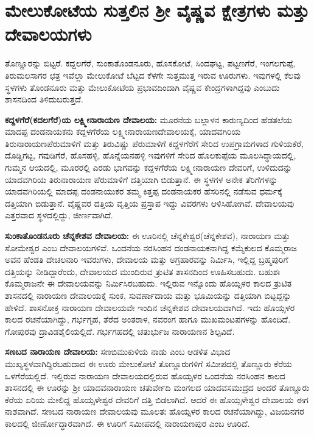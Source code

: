 \section{ಮೇಲುಕೋಟೆಯ ಸುತ್ತಲಿನ ಶ‍್ರೀ ವೈಷ್ಣವ ಕ್ಷೇತ್ರಗಳು ಮತ್ತು ದೇವಾಲಯಗಳು}

ತೊಣ್ಣೂರನ್ನು ಬಿಟ್ಟರೆ. ಕದ್ದಲಗೆರೆ, ಸುಂಕಾತೊಂಡನೂರು, ಹೊಸಕೋಟೆ, ಸಿಂದಘಟ್ಟ, ಪಟ್ಟಣಗೆರೆ, ಇಂಗಲಗುಪ್ಪೆ, ತಿರುಮಲಸಾಗರ ಛತ್ರ ಇವೆಲ್ಲಾ ಮೇಲುಕೋಟೆ ಬೆಟ್ಟದ ಕೆಳಗೇ ಸುತ್ತಮುತ್ತ ಇರುವ ಊರುಗಳು. ಇವುಗಳಲ್ಲಿ ಕೆಲವು ಸ್ಥಳಗಳು ತೊಂಡನೂರು ಮತ್ತು ಮೇಲುಕೋಟೆಯ ಪ್ರಭಾವದಿಂದಾಗಿ ವೈಷ್ಣವ ಕೇಂದ್ರಗಳಾಗಿದ್ದವು ಎಂಬುದು ಶಾಸನದಿಂದ ತಿಳಿದುಬರುತ್ತದೆ.

\textbf{ಕದ್ದಳಗೆರೆ(ಕದಲಗೆರೆ)ಯ ಲಕ್ಷ್ಮೀನಾರಾಯಣ ದೇವಾಲಯ:} ಮೂರನೆಯ ಬಲ್ಲಾಳನ ಕಾರುಣ್ಯದಿಂದ ಹೆಡತಲೆಯ ಮಾದಪ್ಪ ದಂಡನಾಯಕನು ಕದ್ದಳಗೆರೆಯ ಲಕ್ಷ್ಮೀನಾರಾಯಣದೇವಾಲಯಕ್ಕೆ, ಯಾದವಗಿರಿಯ ತಿರುನಾರಾಯಣಪೆರುಮಾಳಿಗೆ ಮತ್ತು ತಿರುವಿಷ್ಣು ಪೆರುಮಾಳಿಗೆ ಕದ್ದಳಗೆರೆಗೆ ಸೇರಿದ ಉಪಗ್ರಾಮಗಳಾದ ಗುಳಿಯಕೆರೆ, ದೊಡ್ಡಿಗಟ್ಟ, ಗವುಡಿಗೆರೆ, ಹೊಸಹಳ್ಳಿ, ಹೊನ್ನೆಯನಹಳ್ಳಿ ಇವುಗಳಿಗೆ ಸೇರಿದ ಹೊಲಕುಪ್ಪೆಯ ಮೂಲಸಿದ್ಧಾಯದಲ್ಲಿ, ಗುಮ್ಮನ ಆಯದಲ್ಲಿ, ಮೂರರಲ್ಲಿ ಎರಡು ಭಾಗವನ್ನು ಕದ್ದಳಗೆರೆಯ ಲಕ್ಷ್ಮೀನಾರಾಯಣ ದೇವರಿಗೆ, ಉಳಿದುದನ್ನು ಯಾದವಗಿರಿಯ ತಿರುನಾರಾಯಣ ಪೆರುಮಾಳಿಗೆ ದತ್ತಿಯಾಗಿ ಬಿಡುತ್ತಾನೆ. ಈ ಸ್ಥಳಗಳ ಅನೇಕ ತೆರಿಗೆಗಳನ್ನು ಯಾದವಗಿರಿಯಲ್ಲಿ ಮಾದಪ್ಪ ದಂಡನಾಯುಕರ ತಮ್ಮ ಕಿತ್ತಪ್ಪ ದಂಡನಾಯಕರ ಹೆಸರಿನಲ್ಲಿ ನಡೆಸುವ ಧರ್ಮಕ್ಕೆ ದತ್ತಿಯಾಗಿ ಬಿಡುತ್ತಾನೆ. ವೈಷ್ಣವರ ದತ್ತಿಯ ವೃತ್ತಿಯ ಪ್ರಸ್ತಾಪ ಇದ್ದು ವಿವರಗಳು ಆಳಿಸಿಹೋಗಿವೆ. ದೇವಾಲಯವು ಎತ್ತರವಾದ ಸ್ಥಳದಲ್ಲಿದ್ದು, ಜೀರ್ಣವಾಗಿದೆ. 

\textbf{ಸುಂಕಾತೊಂಡನೂರು ಚೆನ್ನಕೇಶವ ದೇವಾಲಯ:} ಈ ಊರಿನಲ್ಲಿ ಚೆನ್ನಕೇಶ್ವರ(ಚೆನ್ನಕೇಶವ), ನಾರಾಯಣ ಮತ್ತು ಸೋಮೇಶ್ವರ ಎಂಬ ದೇವಾಲಯಗಳಿವೆ. ಒಂದನೆಯ ನರಸಿಂಹನ ದಂಡನಾಯಕನಾಗಿದ್ದ ಕಮ್ಮೆಕುಲದ ಕೊಮ್ಮರಾಜ ಅವನ ಹೆಂಡತಿ ದೇಚಲನಾರಿ ಇವರುಗಳು, ದೇವಾಲಯ ಮತ್ತು ಅಗ್ರಹಾರವನ್ನು ನಿರ್ಮಿಸಿ, ಇಲ್ಲಿದ್ದ ಬ್ರಹ್ಮಪುರಿಗೆ ದತ್ತಿಯನ್ನು ನೀಡಿದ್ದಾರೆಂದು, ದೇವಾಲಯದ ಮುಂದಿರುವ ತ್ರುಟಿತ ಶಾಸನದಿಂದ ಊಹಿಸಬಹುದು. ಬಹುಶಃ ಕೊಮ್ಮರಾಜನೇ ಈ ದೇವಾಲಯವನ್ನು ನಿರ್ಮಿಸಿರಬಹುದು. ಇಲ್ಲಿರುವ ಇನ್ನೊಂದು ಹೊಯ್ಸಳರ ಕಾಲದ ತ್ರುಟಿತ ಶಾಸನದಲ್ಲಿ ನಾರಾಯಣ ದೇವಾಲಯಕ್ಕೆ ಸುಂಕ, ಸುವರ್ಣಾದಾಯ ಮತ್ತು ಭೂಮಿಯನ್ನು ದತ್ತಿಯಾಗಿ ಬಿಟ್ಟದ್ದನ್ನು ಹೇಳಿದೆ. ಶಾಸನೋಕ್ತ ನಾರಾಯಣ ದೇವಾಲಯವೇ ಇಂದಿನ ಚೆನ್ನಕೇಶವ ದೇವಾಲಯವಾಗಿದೆ. ಇದು ಹೊಯ್ಸಳರ ಕಾಲದ ರಚನೆಯಾಗಿದ್ದು, ಗರ್ಭಗೃಹ, ತೆರೆದ ಅಂತರಾಳ, ನವರಂಗ ಹಾಗೂ ಮುಖಮಂಟಪಗಳನ್ನು ಹೊಂದಿದೆ. ಗೋಪುರವು ದ್ರಾವಿಡಶೈಲಿಯಲ್ಲಿದೆ. ಗರ್ಭಗಹದಲ್ಲಿ ಚತುರ್ಭುಜ ನಾರಾಯಣನ ಶಿಲ್ಪವಿದೆ.

\textbf{ಸಣಬದ ನಾರಾಯಣ ದೇವಾಲಯ:} ಸಣಬಿಮುಕುಳಿಯ ನಾಡು ಎಂಬ ಆಡಳಿತ ವಿಭಾದ ಮುಖ್ಯಸ್ಥಳವಾಗಿದ್ದಿರಬಹುದಾದ ಈ ಊರು ಮೇಲುಕೋಟೆ ತೊಣ್ಣೂರುಗಳಿಗೆ ಸಮೀಪದಲ್ಲಿ ತೊಣ್ಣೂರು ಕೆರೆಯ ಒಳಗೆರೆಯಲ್ಲಿದೆ. ಇಲ್ಲಿರುವ ನಾರಾಯಣ ದೇವಾಲಯದಲ್ಲಿರುವ ಹೊಯ್ಸಳರ ಒಂದನೆಯ ನರಸಿಂಹನ ಕಾಲದ ಶಾಸನದಲ್ಲಿ ಈ ಊರನ್ನು ಶ‍್ರೀ ಯಾದವನಾರಾಯಣ ಚತುರ್ವೇದಿ ಮಂಗಲದ ಯಾದವಸಮುದ್ರದ ಅಂದರೆ ತೊಣ್ಣೂರು ಕೆರೆಯ ಏರಿಯ ಮೇಲಿದ್ದ ಹೊಯ್ಸಳೇಶ್ವರ ದೇವರಿಗೆ ದತ್ತಿ ಬಿಡಲಾಗಿದೆ. ಆದರೆ ಈ ಹೊಯ್ಸಳೇಶ್ವರ ದೇವಾಲಯ ಈಗ ನಾಶವಾಗಿದೆ. ಸಣಬದ ನಾರಾಯಣ ದೇವಾಲಯವು ಮೂಲತಃ ಹೊಯ್ಸಳರ ಕಾಲದ ರಚನೆಯಾಗಿದ್ದು, ವಿಜಯನಗರ ಕಾಲದಲ್ಲಿ ಜೀರ್ಣೋದ್ಧಾರವಾಗಿದೆ. ಈ ಊರಿಗೆ ಸಮೀಪದಲ್ಲಿ ನಾರಾಯಣಪುರ ಎಂಬ ಊರಿದೆ. 

